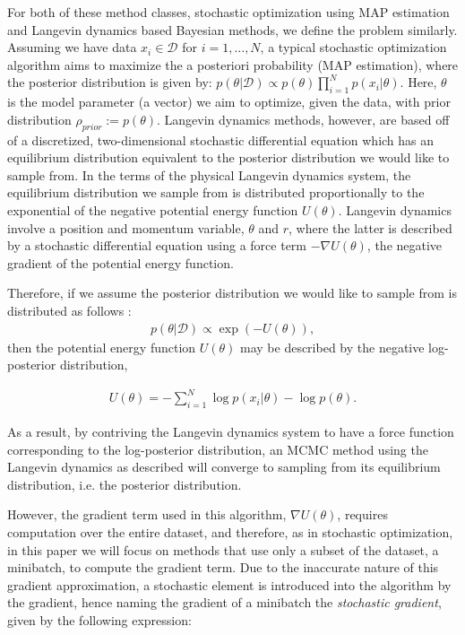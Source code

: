 \documentclass[11pt]{article}
\begin{document}
For both of these method classes, stochastic optimization using MAP estimation and Langevin dynamics based Bayesian methods, we define the problem similarly.
Assuming we have data $x_i \in \mathcal{D}$ for $i=1,...,N$, a typical stochastic optimization algorithm aims to maximize the a posteriori probability (MAP estimation), where the posterior distribution is given by: $p(\theta|\mathcal{D}) \propto{p(\theta)\prod_{i=1}^N p(x_i |\theta)}$. Here, $\theta$ is the model parameter (a vector) we aim to optimize, given the data, with prior distribution $\rho_{prior} := p(\theta)$. 
Langevin dynamics methods, however, are based off of a discretized, two-dimensional stochastic differential equation which has an equilibrium distribution equivalent to the posterior distribution we would like to sample from. In the terms of the physical Langevin dynamics system, the equilibrium distribution we sample from is distributed proportionally to the exponential of the negative potential energy function $U(\theta)$. Langevin dynamics involve a position and momentum variable, $\theta$ and $r$, where the latter is described by a stochastic differential equation using a force term $-\nabla U(\theta)$, the negative gradient of the potential energy function.

Therefore, if we assume the posterior distribution we would like to sample from is distributed as follows \cite[Equation 1]{Chen:2014:SGH:3044805.3045080}:
\begin{align}
    p(\theta|\mathcal{D}) \propto {\exp(-U(\theta))},
\end{align}
then the potential energy function $U(\theta)$ may be described by the negative log-posterior distribution,

\begin{align}
    U(\theta)= -\sum_{i=1}^N \log p(x_i|\theta) - \log p(\theta).
\end{align}

\par
As a result, by contriving the Langevin dynamics system to have a force function corresponding to the log-posterior distribution, an MCMC method using the Langevin dynamics as described will converge to sampling from its equilibrium distribution, i.e. the posterior distribution. \par 
However, the gradient term used in this algorithm, $\nabla U(\theta)$, requires computation over the entire dataset, and therefore, as in stochastic optimization, in this paper we will focus on methods that use only a subset of the dataset, a minibatch, to compute the gradient term. Due to the inaccurate nature of this gradient approximation, a stochastic element is introduced into the algorithm by the gradient, hence naming the gradient of a minibatch the \textit{stochastic gradient}, given by the following expression:
\end{document}
